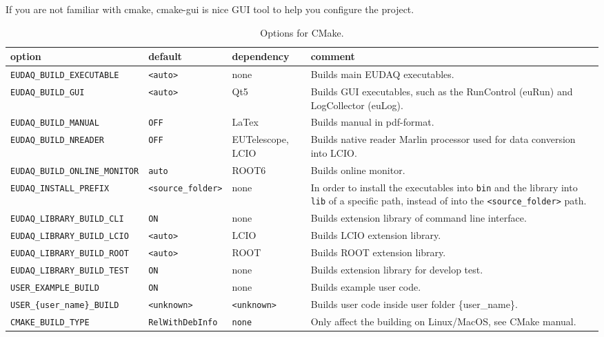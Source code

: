 If you are not familiar with cmake, cmake-gui is nice GUI tool to help you configure the project.

\begin{table}[!h]
{\footnotesize
\begin{tabular}{l|l|p{2cm}|p{5.5cm}}
option &  default &  dependency & comment \\
\hline
\texttt{EUDAQ\_BUILD\_EXECUTABLE} &  \texttt{<auto>} & none & Builds main EUDAQ executables.\\
\texttt{EUDAQ\_BUILD\_GUI} & \texttt{<auto>} & Qt5 & Builds GUI executables, such as the RunControl (euRun) and LogCollector (euLog).\\
\texttt{EUDAQ\_BUILD\_MANUAL} & \texttt{OFF} & LaTex &  Builds manual in pdf-format.  \\
\texttt{EUDAQ\_BUILD\_NREADER} & \texttt{OFF} & EUTelescope, LCIO &  Builds native reader Marlin processor used for data conversion into LCIO.\\
\texttt{EUDAQ\_BUILD\_ONLINE\_MONITOR} & \texttt{auto} & ROOT6 &  Builds online monitor.  \\
\texttt{EUDAQ\_INSTALL\_PREFIX} & \texttt{<source\_folder>} & none & In order to install the executables into \texttt{bin} and the library into \texttt{lib} of a specific path, instead of into the \texttt{<source\_folder>} path.\\
\texttt{EUDAQ\_LIBRARY\_BUILD\_CLI} & \texttt{ON} & none & Builds extension library of command line interface.\\
\texttt{EUDAQ\_LIBRARY\_BUILD\_LCIO} & \texttt{<auto>} & LCIO & Builds LCIO extension library.\\
\texttt{EUDAQ\_LIBRARY\_BUILD\_ROOT} & \texttt{<auto>} & ROOT & Builds ROOT extension library.\\
\texttt{EUDAQ\_LIBRARY\_BUILD\_TEST} & \texttt{ON} & none & Builds extension library for develop test.\\
\texttt{USER\_EXAMPLE\_BUILD} & \texttt{ON} & none & Builds example user code.\\
\texttt{USER\_\{user\_name\}\_BUILD} & \texttt{<unknown>} & \texttt{<unknown>} & Builds user code inside user folder \{user\_name\}.\\
\texttt{CMAKE\_BUILD\_TYPE} & \texttt{RelWithDebInfo} & \texttt{none} & Only affect the building on Linux/MacOS, see CMake manual.\\
\end{tabular}
\caption{Options for CMake.}
\label{tab:cmakeoptions}
}
\end{table}

